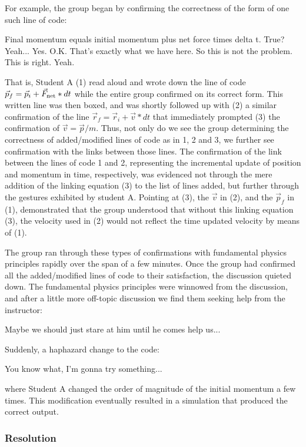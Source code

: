 \documentclass{msuphddissertation}
\begin{document}
\begin{doublespace}
For example, the group began by confirming the correctness of the form of one such line of code:\begin{description}
\SA Final momentum equals initial momentum
plus net force times delta t. True?
\SC Yeah...
\SB Yes.
\SA O.K. That's exactly what we have here. So this is not the problem. This is right.
\SD Yeah.\end{description}  That is, Student A (1) read aloud and wrote down the
line of code $\vec{p}_{f} = \vec{p}_{i} + \vec{F}_{\rm net}*dt$ while the entire group confirmed on its correct form.  This written line was then boxed, and was shortly followed up with (2) a similar confirmation of the line $\vec{r}_{f} = \vec{r}_{i} + \vec{v}*dt$ that immediately
prompted (3) the confirmation of $\vec{v} = \vec{p}/m$. Thus, not only do we see the group determining the correctness of added/modified lines of code as in 1, 2 and 3, we further see confirmation with the links between those lines. The confirmation of the link between the lines of code 1 and 2, representing the incremental update of position and momentum in time, respectively, was evidenced not through the mere addition of the linking equation (3) to the list of lines added, but further through the gestures exhibited by student A. Pointing at (3), the $\vec{v}$ in (2), and the $\vec{p}_{f}$ in (1), demonstrated that the group understood that without this linking equation (3), the velocity used in (2) would not reflect the time updated velocity by means of (1).

The group ran through these types of confirmations with fundamental physics principles rapidly over the span of a few minutes. Once the group had confirmed all the added/modified lines of code to their satisfaction, the discussion quieted down. The fundamental physics principles were winnowed from the discussion, and after a little more off-topic discussion we find them seeking help from the instructor:\begin{description}
\SD  Maybe we should just stare at him until he comes help us...\end{description} Suddenly, a haphazard change to the code:\begin{description}
\SA You know what, I'm gonna try something... \end{description} where Student A changed the order of magnitude of the initial momentum a few times. This modification eventually resulted in a simulation that produced the correct output.

\subsubsection{Resolution}


\end{doublespace}
\end{document}
